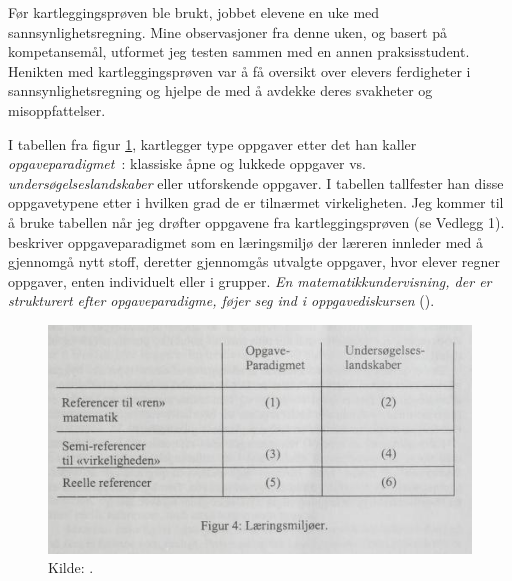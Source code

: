\documentclass[main.tex]{subfiles}
\begin{document}
Før kartleggingsprøven ble brukt, jobbet elevene en uke med sannsynlighetsregning. Mine observasjoner fra denne uken, 
og basert på kompetansemål, utformet jeg testen sammen med en annen praksisstudent. Henikten med kartleggingsprøven 
var å få oversikt over elevers ferdigheter i sannsynlighetsregning og hjelpe de med å avdekke deres
svakheter og misoppfattelser. 

I tabellen fra figur \ref{fig:skov98}, kartlegger  type oppgaver etter det han kaller 
\mbox{\emph{opgaveparadigmet} :}
klassiske åpne og lukkede oppgaver vs. \emph{undersøgelseslandskaber} eller utforskende oppgaver. I tabellen tallfester
han disse oppgavetypene etter i hvilken grad de er tilnærmet virkeligheten. Jeg kommer til å bruke tabellen når jeg
drøfter oppgavene fra kartleggingsprøven (se Vedlegg 1).  beskriver oppgaveparadigmet som
en læringsmiljø der læreren innleder med å gjennomgå nytt stoff, deretter gjennomgås utvalgte oppgaver, hvor elever 
regner oppgaver, enten individuelt eller i grupper. \emph{En matematikkundervisning, der er strukturert efter 
opgaveparadigme, føjer seg ind i \guillemotleft oppgavediskursen\guillemotright} ().
\begin{figure}[h!]
\centering
\includegraphics[scale = 0.7]{../figures/laeringsmiljoer.png}
\caption{Kilde: \protect{}.}
\label{fig:skov98}
\end{figure}
\end{document}
